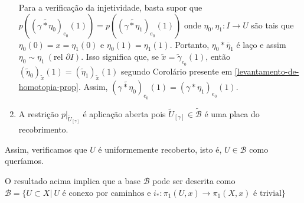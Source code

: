 \begin{dem}
\begin{enumerate}
        Para a verificação da injetividade, basta supor que $p((\widetilde{\gamma*\eta_0})_{e_0}(1))=p((\widetilde{\gamma*\eta_1})_{e_0}(1))$ onde $\eta_0, \eta_1:I\rightarrow U$ são tais que $\eta_0(0)=x=\eta_1(0)$ e $\eta_0(1)=\eta_1(1)$. Portanto, $\eta_0*\overline{\eta}_1$ é laço e assim $\eta_0\sim \eta_1~(\text{rel }\partial I)$.
        Isso significa que, se $\tilde{x}=\tilde{\gamma}_{e_0}(1)$, então $(\tilde{\eta}_0)_{\tilde{x}}(1)= (\tilde{\eta}_1)_{\tilde{x}}(1)$ segundo Corolário presente em \ref{levantamento-de-homotopia-prop}. Assim, $(\widetilde{\gamma*\eta_0})_{e_0}(1)=(\gamma*\eta_1)_{e_0}(1)$.\newline

        \item A restrição $p|_{\tilde{U}_{[\gamma]}}$ é aplicação aberta pois $\tilde{U}_{[\gamma]}\in \tilde{\mathcal{B}}$ é uma placa do recobrimento.\newline
    \end{enumerate}

    Assim, verificamos que $U$ é uniformemente recoberto, isto é, $U \in \mathcal{B}$ como queríamos.\newline
\end{dem}

O resultado acima implica que a base $\mathcal{B}$ pode ser descrita como $\mathcal{B}=\{U\subset X|~U\text{ é conexo por caminhos e }i_*:\pi_1(U,x)\rightarrow \pi_1(X,x)\text{ é trivial}\}$


